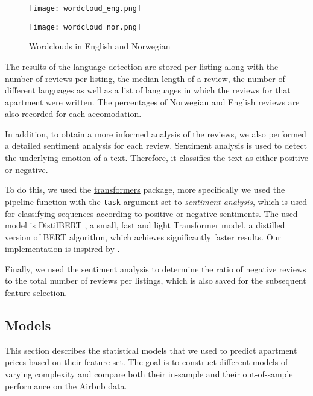 \begin{figure}[t]
  \centering
  \begin{minipage}{6.7cm}
    \texttt{[image: wordcloud\_eng.png]}
  \end{minipage}
  \begin{minipage}{6.7cm}
    \texttt{[image: wordcloud\_nor.png]}
  \end{minipage}
  \caption{Wordclouds in English and Norwegian}
  \label{fig:wordclouds}
\end{figure}

The results of the language detection are stored per listing along with the number of reviews per listing, the median length of a review, the number of different languages as well as a list of languages in which the reviews for that apartment were written.
The percentages of Norwegian and English reviews are also recorded for each accomodation.

In addition, to obtain a more informed analysis of the reviews, we also performed a detailed sentiment analysis for each review.
Sentiment analysis is used to detect the underlying emotion of a text.
Therefore, it classifies the text as either positive or negative.

To do this, we used the \href{https://huggingface.co/transformers/v3.0.2/model_doc/distilbert.html}{transformers} package, more specifically we used the \href{https://huggingface.co/transformers/v3.0.2/main_classes/pipelines.html}{pipeline} function with the \texttt{task} argument set to \textit{sentiment-analysis}, which is used for classifying sequences according to positive or negative sentiments.
The used model is DistilBERT \citep{sanh2020}, a small, fast and light Transformer model, a distilled version of BERT \citep{devlin2019} algorithm, which achieves significantly faster results.
Our implementation is inspired by \citep{selvaraj2020}.

Finally, we used the sentiment analysis to determine the ratio of negative reviews to the total number of reviews per listings, which is also saved for the subsequent feature selection.


\subsection{Models}

This section describes the statistical models that we used to predict apartment prices based on their feature set.
The goal is to construct different models of varying complexity and compare both their in-sample and their out-of-sample performance on the Airbnb data.

